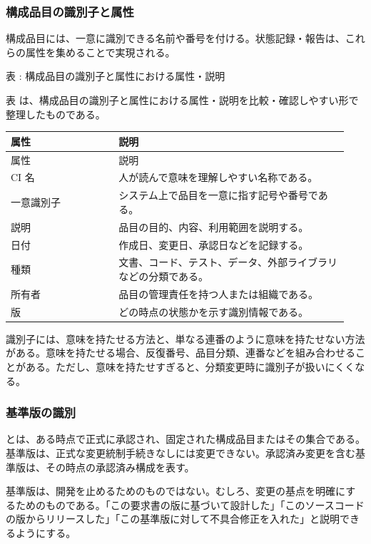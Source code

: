 \subsubsection*{構成品目の識別子と属性}
構成品目には、一意に識別できる名前や番号を付ける。状態記録・報告は、これらの属性を集めることで実現される。

\par\smallskip\noindent{}\label{tab:ch08-03}表 \thetable: 構成品目の識別子と属性における属性・説明\par\smallskip
表 \thetable は、構成品目の識別子と属性における属性・説明を比較・確認しやすい形で整理したものである。\par\smallskip
\begin{longtable}{p{0.30\linewidth}p{0.64\linewidth}}\toprule
属性 & 説明 \\ \midrule
\endfirsthead\toprule
属性 & 説明 \\ \midrule
\endhead
CI 名 & 人が読んで意味を理解しやすい名称である。 \\
一意識別子 & システム上で品目を一意に指す記号や番号である。 \\
説明 & 品目の目的、内容、利用範囲を説明する。 \\
日付 & 作成日、変更日、承認日などを記録する。 \\
種類 & 文書、コード、テスト、データ、外部ライブラリなどの分類である。 \\
所有者 & 品目の管理責任を持つ人または組織である。 \\
版 & どの時点の状態かを示す識別情報である。 \\
\bottomrule\end{longtable}
識別子には、意味を持たせる方法と、単なる連番のように意味を持たせない方法がある。意味を持たせる場合、反復番号、品目分類、連番などを組み合わせることがある。ただし、意味を持たせすぎると、分類変更時に識別子が扱いにくくなる。

\subsubsection*{基準版の識別}
とは、ある時点で正式に承認され、固定された構成品目またはその集合である。基準版は、正式な変更統制手続きなしには変更できない。承認済み変更を含む基準版は、その時点の承認済み構成を表す。

基準版は、開発を止めるためのものではない。むしろ、変更の基点を明確にするためのものである。「この要求書の版に基づいて設計した」「このソースコードの版からリリースした」「この基準版に対して不具合修正を入れた」と説明できるようにする。


